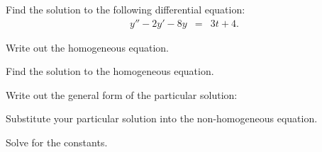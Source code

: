   \begin{problem}
  \item Find the solution to the following differential equation:
    \begin{eqnarray*}
      y'' - 2y' - 8y & = & 3t + 4.
    \end{eqnarray*}
    \begin{subproblem}
    \item Write out the homogeneous equation.
      \vspace{2em}
    \item Find the solution to the homogeneous equation.
      \vfill

    \clearpage

  \item Write out the general form of the particular solution:
    \vspace{2em}

  \item Substitute your particular solution into the non-homogeneous equation.
    \vfill

  \item Solve for the constants.
    \vfill

  \end{subproblem}

  \end{problem}

